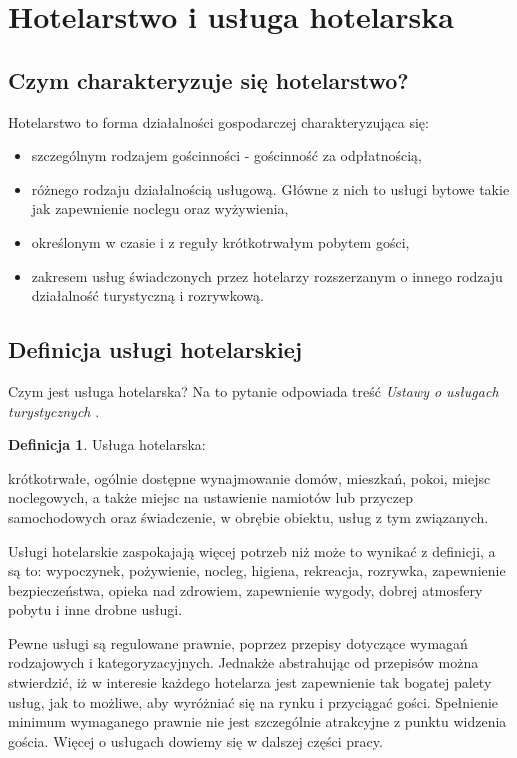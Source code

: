 \documentclass[a4paper,onecolumn,oneside,11pt,wide,floatssmall]{mwrep}
\theoremstyle{definition}
\newtheorem{defn}{Definicja}[section]
\theoremstyle{plain}%
\theoremstyle{remark}
\begin{document}
\section{Hotelarstwo i usługa hotelarska}

\subsection{Czym charakteryzuje się hotelarstwo?}

Hotelarstwo to forma działalności gospodarczej charakteryzująca się:
\begin{itemize} 
  \item szczególnym rodzajem gościnności - gościnność za odpłatnością,
  \item różnego rodzaju działalnością usługową. Główne z 
  nich to usługi bytowe takie jak zapewnienie noclegu oraz wyżywienia,
  \item określonym w czasie i z reguły krótkotrwałym pobytem gości,  
  \item zakresem usług świadczonych przez hotelarzy rozszerzanym o innego rodzaju działalność turystyczną i rozrywkową.
\end{itemize}

\subsection{Definicja usługi hotelarskiej}

Czym jest usługa hotelarska? Na to pytanie odpowiada treść \textit{Ustawy o usługach 
turystycznych} \cite{ust:tur}.

\begin{defn}{Usługa hotelarska:}

krótkotrwałe, ogólnie dostępne wynajmowanie domów, mieszkań, pokoi, miejsc 
noclegowych, a także miejsc na ustawienie namiotów lub przyczep 
samochodowych oraz świadczenie, w obrębie obiektu, usług z tym związanych.

\end{defn}

Usługi hotelarskie zaspokajają więcej potrzeb niż może to wynikać z 
definicji, a są to: wypoczynek, pożywienie, nocleg, higiena, rekreacja, 
rozrywka, zapewnienie bezpieczeństwa, opieka nad zdrowiem, zapewnienie 
wygody, dobrej atmosfery pobytu i inne drobne usługi.

Pewne usługi są regulowane prawnie, poprzez przepisy dotyczące wymagań 
rodzajowych i kategoryzacyjnych. Jednakże abstrahując od przepisów można 
stwierdzić, iż w interesie każdego hotelarza jest zapewnienie tak bogatej 
palety usług, jak to możliwe, aby wyróżniać się na rynku i przyciągać gości. 
Spełnienie minimum wymaganego prawnie nie jest szczególnie atrakcyjne z 
punktu widzenia gościa. Więcej o usługach dowiemy się w dalszej części pracy.
\end{document}
